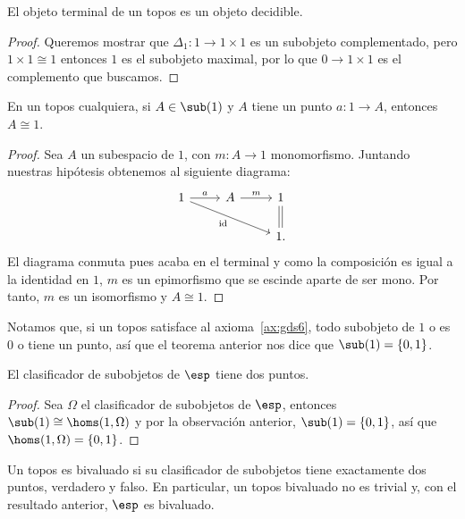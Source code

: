 \begin{proposition}[label=prop:terminaldiscreto]
  El objeto terminal de un topos es un objeto decidible.
\end{proposition}
\begin{proof}
  Queremos mostrar que $\Delta_1\colon 1\to 1\times 1$ es un subobjeto complementado, pero $1\times 1 \cong 1$
  entonces $1$ es el subobjeto maximal, por lo que $0 \to 1\times 1$ es el complemento que buscamos.
\end{proof}

\begin{theorem}
  En un topos cualquiera, si $A\in \sub(1)$ y $A$ tiene un punto $a\colon 1\to A$, entonces $A \cong 1$.
\end{theorem}
\begin{proof}
  Sea $A$ un subespacio de $1$, con $m\colon A\to 1$ monomorfismo. Juntando nuestras hipótesis obtenemos al siguiente diagrama:
  \begin{equation*}
    \begin{tikzcd}
      1\ar{r}{a}\ar[swap]{rrd}{\text{id}} & A\ar{r}{m} & 1\ar[shift left = 0.3ex, no head]{d}{}\ar[shift right = 0.3ex, no head]{d}{} \\
       & {} & 1.
    \end{tikzcd}
  \end{equation*}
  El diagrama conmuta pues acaba en el terminal y como la composición es igual a la identidad
  en $1$, $m$ es un epimorfismo que se escinde aparte de ser mono. Por tanto, $m$ es un isomorfismo y $A\cong 1$.
\end{proof}

\begin{observation}\label{obs:nsbivaluado}
Notamos que, si un topos satisface al axioma~\ref{ax:gds6}, todo subobjeto de $1$ o es $0$ o tiene 
un punto, así que el teorema anterior nos dice que $\sub(1)=\{0,1\}$.
\end{observation}

\begin{corollary}[label=cor:bivaluado]
  El clasificador de subobjetos de $\esp$ tiene dos puntos.
\end{corollary}
\begin{proof}
  Sea $\Omega$ el clasificador de subobjetos de $\esp$, entonces $\sub(1)\cong \homs(1,\Omega)$
  y por la observación anterior, $\sub(1)=\{0,1\}$, así que $\homs(1,\Omega)=\{0,1\}$.
\end{proof}

\begin{definition}[label=def:bivaluado]
  Un topos es bivaluado si su clasificador de subobjetos tiene exactamente dos puntos, verdadero
  y falso. En particular, un topos bivaluado no es trivial y, con el resultado anterior, $\esp$ es bivaluado.
\end{definition}

